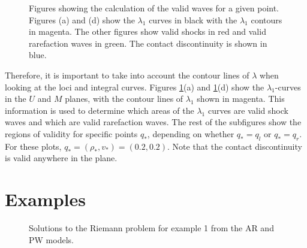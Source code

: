 \documentclass{article}
\begin{document}
\begin{figure}[h!]
{   }
 \caption[Optional caption for list of figures]
 {Figures showing the calculation of the valid waves for a given point. Figures (a)
  and (d) show the $\lambda_1$ curves in black with the $\lambda_1$ contours 
  in magenta. The other figures show valid shocks in red and valid rarefaction 
  waves in green. The contact discontinuity is shown in blue.}
   \label{fig:AR_validity}
\end{figure}

Therefore, it is important to take into account the contour lines of $\lambda$ when 
looking at the loci and integral curves. Figures \ref{fig:AR_validity}(a) and 
\ref{fig:AR_validity}(d) show the $\lambda_1$-curves in the $U$ and $M$ planes,
with the contour lines of $\lambda_1$ shown in magenta. This information is used
to determine which areas of the $\lambda_1$ curves are valid shock waves and which
are valid rarefaction waves. The rest of the subfigures show the regions of validity for 
specific points $q_*$, depending on whether $q_* = q_l$ or $q_* = q_r$. For these plots,
$q_* = (\rho_*,v_*) = (0.2, 0.2)$. Note that the contact discontinuity is valid
anywhere in the plane. 

\section{Examples}

\begin{figure}[h!]
 \centering
 \caption[Optional caption for list of figures]
 {Solutions to the Riemann problem for example 1 from the AR and PW models.}
  \label{fig:example1}
\end{figure}
\end{document}
